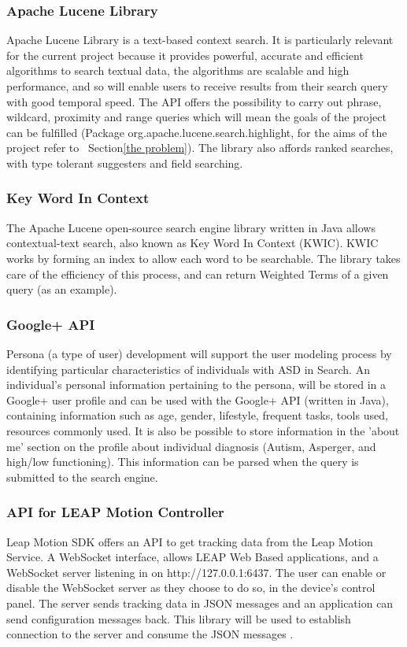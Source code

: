 \documentclass[10pt]{article}
\begin{document}
\subsubsection{Apache Lucene Library}\label{apache}
Apache Lucene Library is a text-based context search. It is particularly relevant for the current project because it provides powerful, accurate and efficient algorithms to search textual data, the algorithms are scalable and high performance, and so will enable users to receive results from their search query with good temporal speed. The API offers the possibility to carry out phrase, wildcard, proximity and range queries which will mean the goals of the project can be fulfilled (Package org.apache.lucene.search.highlight, for the aims of the project refer to ~Section\ref{the problem}). The library also affords ranked searches, with type tolerant suggesters and field searching.

\subsubsection{Key Word In Context} \label{KWIC} 
The Apache Lucene open-source search engine library written in Java allows contextual-text search, also known as Key Word In Context (KWIC)\cite{kwic}. KWIC works by forming an index to allow each word to be searchable. The library takes care of the efficiency of this process, and can return Weighted Terms of a given query (as an example).


\subsubsection{Google+ API}
Persona (a type of user) development will support the user modeling process by identifying particular characteristics of individuals with ASD in Search. An individual’s personal information pertaining to the persona, will be stored in a Google+ user profile and can be used with the Google+ API (written in Java), containing information such as age, gender, lifestyle, frequent tasks, tools used, resources commonly used. It is also be possible to store information in the 'about me' section on the profile about individual diagnosis (Autism, Asperger, and high/low functioning). This information can be parsed when the query is submitted to the search engine.

\subsubsection{API for LEAP Motion Controller}
Leap Motion SDK offers an API to get tracking data from the Leap Motion Service. A WebSocket interface, allows LEAP Web Based applications, and a WebSocket server listening in on http://127.0.0.1:6437. The user can enable or disable the WebSocket server as they choose to do so, in the device's control panel.
The server sends tracking data in JSON messages and an application can send configuration messages back. This library will be used to establish connection to the server and consume the JSON messages \cite{leap}. 
\end{document}
